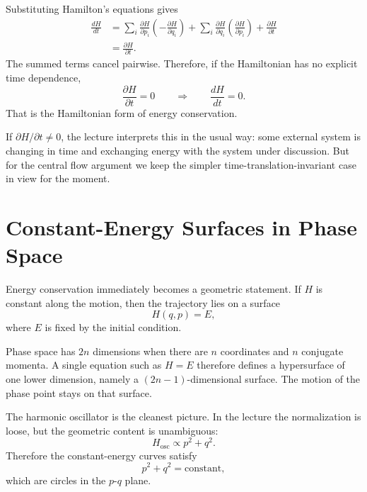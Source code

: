 Substituting Hamilton's equations gives
\begin{align}
\frac{dH}{dt}
&=
\sum_i \frac{\partial H}{\partial p_i}\left(-\frac{\partial H}{\partial q_i}\right)
+
\sum_i \frac{\partial H}{\partial q_i}\left(\frac{\partial H}{\partial p_i}\right)
+
\frac{\partial H}{\partial t} \\
&= \frac{\partial H}{\partial t}.
\end{align}
The summed terms cancel pairwise. Therefore, if the Hamiltonian has no explicit time dependence,
\begin{equation}
\frac{\partial H}{\partial t}=0
\qquad \Longrightarrow \qquad
\frac{dH}{dt}=0.
\end{equation}
That is the Hamiltonian form of energy conservation.

If \(\partial H/\partial t \neq 0\), the lecture interprets this in the usual way: some external system is changing in time and exchanging energy with the system under discussion. But for the central flow argument we keep the simpler time-translation-invariant case in view for the moment.

\section{Constant-Energy Surfaces in Phase Space}

Energy conservation immediately becomes a geometric statement. If \(H\) is constant along the motion, then the trajectory lies on a surface
\begin{equation}
H(q,p)=E,
\end{equation}
where \(E\) is fixed by the initial condition.

Phase space has \(2n\) dimensions when there are \(n\) coordinates and \(n\) conjugate momenta. A single equation such as \(H=E\) therefore defines a hypersurface of one lower dimension, namely a \((2n-1)\)-dimensional surface. The motion of the phase point stays on that surface.

The harmonic oscillator is the cleanest picture. In the lecture the normalization is loose, but the geometric content is unambiguous:
\begin{equation}
H_{\text{osc}} \propto p^2+q^2.
\end{equation}
Therefore the constant-energy curves satisfy
\begin{equation}
p^2+q^2=\text{constant},
\end{equation}
which are circles in the \(p\)-\(q\) plane.

